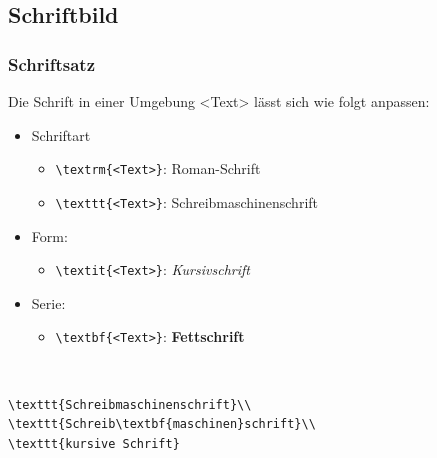 \subsection{Schriftbild}



\begin{frame}[fragile,t]
\frametitle{Schriftsatz}
Die Schrift in einer Umgebung <Text> lässt sich wie folgt anpassen:
\begin{itemize}[<+->]
  \item Schriftart
  \begin{itemize}
    \item \lstinline[style=Latex]+\textrm{<Text>}+: {\rmfamily Roman-Schrift}
    \item \lstinline[style=Latex]+\texttt{<Text>}+: {\ttfamily Schreibmaschinenschrift}
  \end{itemize}  
  \item Form:
  \begin{itemize}
    \item \lstinline[style=Latex]+\textit{<Text>}+: {\itshape Kursivschrift}
  \end{itemize}
  \item Serie:
  \begin{itemize}
    \item {\lstinline[style=Latex]+\textbf{<Text>}+: \bfseries Fettschrift}
  \end{itemize}
\end{itemize}~\\
\pause
{\scriptsize
\begin{minipage}{.55\textwidth}
\begin{lstlisting}[style=Latex]
\texttt{Schreibmaschinenschrift}\\
\texttt{Schreib\textbf{maschinen}schrift}\\
\texttt{kursive Schrift}
\end{lstlisting}
\end{minipage}}\pause~
\begin{minipage}{.39\textwidth}
\end{minipage}

\end{frame}


